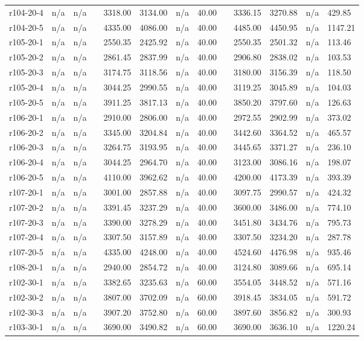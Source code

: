 \documentclass[final,5p,times,twocolumn]{elsarticle}
\begin{document}
{{{{{{{{{{{{{\begin{longtable}{l l l l l l l l l l l l l}
r104-20-4& n/a& n/a&&3318.00& 3134.00& n/a& 40.00&&3336.15& 3270.88& n/a& 429.85\\
r104-20-5& n/a& n/a&&4335.00& 4086.00& n/a& 40.00&&4485.00& 4450.95& n/a& 1147.21\\
r105-20-1& n/a& n/a&&2550.35& 2425.92& n/a& 40.00&&2550.35& 2501.32& n/a& 113.46\\
r105-20-2& n/a& n/a&&2861.45& 2837.99& n/a& 40.00&&2906.80& 2838.02& n/a& 103.53\\
r105-20-3& n/a& n/a&&3174.75& 3118.56& n/a& 40.00&&3180.00& 3156.39& n/a& 118.50\\
r105-20-4& n/a& n/a&&3044.25& 2990.55& n/a& 40.00&&3119.25& 3045.89& n/a& 104.03\\
r105-20-5& n/a& n/a&&3911.25& 3817.13& n/a& 40.00&&3850.20& 3797.60& n/a& 126.63\\
r106-20-1& n/a& n/a&&2910.00& 2806.00& n/a& 40.00&&2972.55& 2902.99& n/a& 373.02\\
r106-20-2& n/a& n/a&&3345.00& 3204.84& n/a& 40.00&&3442.60& 3364.52& n/a& 465.57\\
r106-20-3& n/a& n/a&&3264.75& 3193.95& n/a& 40.00&&3445.65& 3371.27& n/a& 236.10\\
r106-20-4& n/a& n/a&&3044.25& 2964.70& n/a& 40.00&&3123.00& 3086.16& n/a& 198.07\\
r106-20-5& n/a& n/a&&4110.00& 3962.62& n/a& 40.00&&4200.00& 4173.39& n/a& 393.39\\
r107-20-1& n/a& n/a&&3001.00& 2857.88& n/a& 40.00&&3097.75& 2990.57& n/a& 424.32\\
r107-20-2& n/a& n/a&&3391.45& 3237.29& n/a& 40.00&&3600.00& 3486.00& n/a& 774.10\\
r107-20-3& n/a& n/a&&3390.00& 3278.29& n/a& 40.00&&3451.80& 3434.76& n/a& 795.73\\
r107-20-4& n/a& n/a&&3307.50& 3157.89& n/a& 40.00&&3307.50& 3234.20& n/a& 287.78\\
r107-20-5& n/a& n/a&&4335.00& 4248.00& n/a& 40.00&&4524.60& 4476.98& n/a& 935.46\\
r108-20-1& n/a& n/a&&2940.00& 2854.72& n/a& 40.00&&3124.80& 3089.66& n/a& 695.14\\
r102-30-1& n/a& n/a&&3382.65& 3235.63& n/a& 60.00&&3554.05& 3448.52& n/a& 571.16\\
r102-30-2& n/a& n/a&&3807.00& 3702.09& n/a& 60.00&&3918.45& 3834.05& n/a& 591.72\\
r102-30-3& n/a& n/a&&3907.20& 3752.80& n/a& 60.00&&3897.60& 3856.82& n/a& 300.93\\
r103-30-1& n/a& n/a&&3690.00& 3490.82& n/a& 60.00&&3690.00& 3636.10& n/a& 1220.24\\

\end{longtable}}}}}}}}}}}}}}
\end{document}

